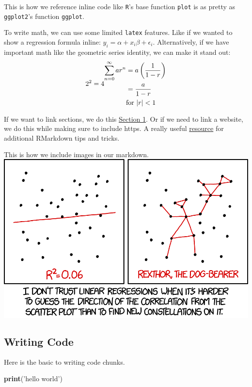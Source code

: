 \documentclass[
]{article}
\newenvironment{Shaded}{\begin{snugshade}}{\end{snugshade}}
\newcommand{\KeywordTok}[1]{\textcolor[rgb]{0.13,0.29,0.53}{\textbf{#1}}}
\newcommand{\NormalTok}[1]{#1}
\newcommand{\StringTok}[1]{\textcolor[rgb]{0.31,0.60,0.02}{#1}}
\begin{document}
This is how we reference inline code like \texttt{R}'s base function
\texttt{plot} is as pretty as \texttt{ggplot2}'s function
\texttt{ggplot}.

To write math, we can use some limited \texttt{latex} features. Like if
we wanted to show a regression formula inline:
\(y_i = \alpha + x_i\beta + \epsilon_i\). Alternatively, if we have
important math like the geometric series identity, we can make it stand
out: \[
2^2 = 4\\
\begin{align*}
  \sum_{n=0}^\infty ar^n & = a \left( \frac{1}{1-r} \right)\\
  & = \frac{a}{1-r}\\
  & \text{for } |r| < 1
\end{align*}
\]

If we want to link sections, we do this
\protect\hyperlink{section-1}{Section 1}. Or if we need to link a
website, we do this while making sure to include https. A really useful
\href{https:/www.bookdown.org/yihui/rmarkdown}{resource} for additional
RMarkdown tips and tricks.

This is how we include images in our markdown.
\includegraphics{linear_regression_2x.png}

\hypertarget{writing-code}{%
\subsection{Writing Code}\label{writing-code}}

Here is the basic to writing code chunks.

\begin{Shaded}
\begin{Highlighting}[]
\KeywordTok{print}\NormalTok{(}\StringTok{'hello world'}\NormalTok{)}
\end{Highlighting}
\end{Shaded}
\end{document}
